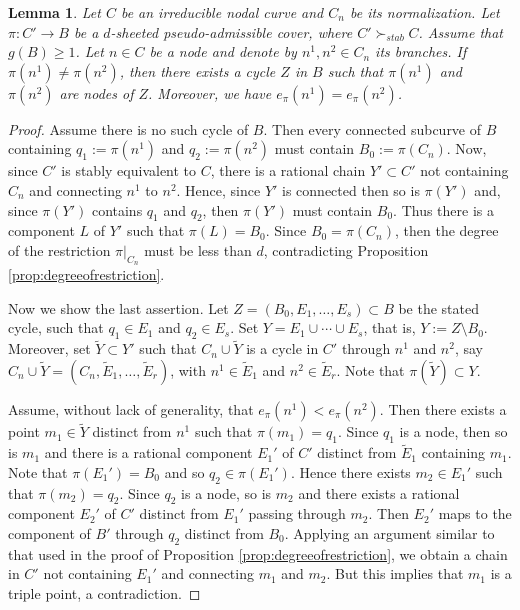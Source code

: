 \documentclass{article}
\newtheorem{lemma}[theorem]{Lemma}
\newcommand{\steq}{\succ_{stab}}
\renewcommand{\:}{\colon }
\begin{document}
\begin{lemma}\label{lem:lemablock} %
Let $C$ be an irreducible nodal curve and $C_n$ be its normalization. 
Let $\pi:{C}'\rightarrow B$ be
a $d$-sheeted pseudo-admissible cover, 
where ${C}'\steq C$. %
Assume that $g(B)\geq 1$. %
Let $n\in C$ be a node and denote by $n^1,n^2\in C_n$ its branches.
If $\pi(n^1)\neq \pi(n^2)$,  then there exists a cycle $Z$ in $B$ such that  $\pi(n^1)$ and $ \pi(n^2)$ are nodes of $Z$.
Moreover, we have $e_\pi(n^1)=e_\pi(n^2)$.
\end{lemma}
\begin{proof}
Assume there is no  such cycle of $B$. 
Then every connected subcurve of $B$ containing $q_1:=\pi(n^1)$ and $q_2:= \pi(n^2)$ must contain $B_0:=\pi(C_n)$. 
Now, since $C'$ is stably equivalent to $C$, 
there is a rational chain $Y' \subset {C}'$ not containing $C_n$ and connecting $n^1$ to $n^2$. 
Hence, since $Y'$ is connected then so is $\pi(Y')$ and, since $\pi(Y')$ contains $q_1$ and $q_2$,
 then 
$\pi(Y')$ must contain $B_0$. 
Thus there is a component $L$ of $Y'$ such that $\pi(L)=B_0$.
Since $B_0=\pi(C_n)$, then the degree of the restriction
$\pi|_{C_n}$
must be less than
$d$, contradicting Proposition  \ref{prop:degreeofrestriction}. 

Now we show the last assertion.  
Let $Z=(B_0,E_1,\ldots,E_s)\subset B$ be the stated cycle, such that $q_1\in E_1$ and $q_2\in E_s$.
Set $Y=E_1\cup\cdots\cup E_s$, that is, $Y:=Z\setminus B_0$. 
Moreover,
set $\widetilde Y\subset Y'$ such that $C_n \cup\widetilde Y$ is a cycle in $C'$ through $n^1$ and $n^2$, 
say 
$C_n \cup\widetilde Y=(C_n,\widetilde E_1,\ldots,\widetilde E_r)$, with $n^1\in \widetilde E_1$ and $n^2\in \widetilde E_r$.
Note that $\pi(\widetilde Y)\subset Y$. 

Assume, without lack of generality, that $e_\pi(n^1)<e_\pi(n^2)$.
Then there exists a point $m_1\in \widetilde Y$ distinct from $n^1$ such that $\pi(m_1)=q_1$. 
Since $q_1$ is a node, then so is $m_1$ and there is a rational component $E_1'$ of $C'$ 
distinct from $\widetilde E_1$ containing $m_1$. 
Note that 
$\pi(E_1')=B_0$ and so $q_2\in \pi(E_1')$. Hence there exists $m_2\in E_1'$ such that $\pi(m_2)=q_2$. 
Since $q_2$ is a node, so is $m_2$ and there exists a rational component $E_2'$ of $C'$ 
distinct from $E_1'$ passing through $m_2$. 
Then $E_2'$ maps to the component of $B'$ through $q_2$ distinct from $B_0$.
Applying an argument similar to that used in the proof of 
Proposition \ref{prop:degreeofrestriction}, 
we obtain a chain in $C'$ not containing $E_1'$ and connecting $m_1$ and $m_2$. 
But this implies that $m_1$ is a triple point, a contradiction.
\end{proof}
\end{document}
